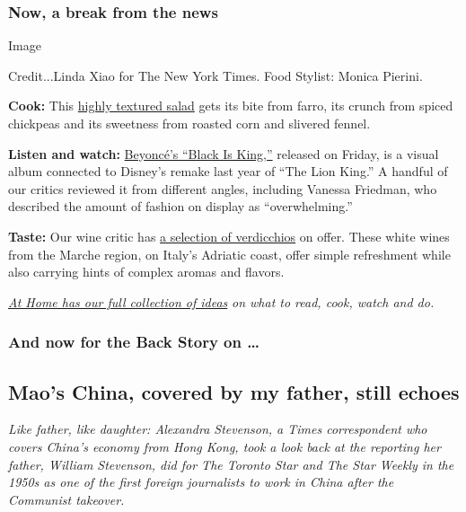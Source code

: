 \hypertarget{now-a-break-from-the-news}{%
\subsubsection{Now, a break from the
news}\label{now-a-break-from-the-news}}

Image

Credit...Linda Xiao for The New York Times. Food Stylist: Monica
Pierini.

\textbf{Cook:} This
\href{https://www.nytimes.com/2020/07/31/dining/farro-corn-chickpea-salad-recipe.html}{highly
textured salad} gets its bite from farro, its crunch from spiced
chickpeas and its sweetness from roasted corn and slivered fennel.

\textbf{Listen and watch:}
\href{https://www.nytimes.com/2020/07/31/arts/music/beyonce-black-is-king.html}{Beyoncé's
``Black Is King,''} released on Friday, is a visual album connected to
Disney's remake last year of ``The Lion King.'' A handful of our critics
reviewed it from different angles, including Vanessa Friedman, who
described the amount of fashion on display as ``overwhelming.''

\textbf{Taste:} Our wine critic has
\href{https://www.nytimes.com/2020/07/30/dining/drinks/wine-school-verdicchio-di-matelica.html?action=click\&module=RelatedLinks\&pgtype=collection}{a
selection of verdicchios} on offer. These white wines from the Marche
region, on Italy's Adriatic coast, offer simple refreshment while also
carrying hints of complex aromas and flavors.

\href{https://www.nytimes.com/spotlight/at-home}{\emph{At Home has our
full collection of ideas}} \emph{on what to read, cook, watch and do.}

\hypertarget{and-now-for-the-back-story-on-}{%
\subsubsection{And now for the Back Story on
\ldots{}}\label{and-now-for-the-back-story-on-}}

\hypertarget{maos-china-covered-by-my-father-still-echoes}{%
\subsection{Mao's China, covered by my father, still
echoes}\label{maos-china-covered-by-my-father-still-echoes}}

\emph{Like father, like daughter: Alexandra Stevenson, a Times
correspondent who covers China's economy from Hong Kong, took a look
back at the reporting her father, William Stevenson, did for The Toronto
Star and The Star Weekly in the 1950s as one of the first foreign
journalists to work in China after the Communist takeover.}

